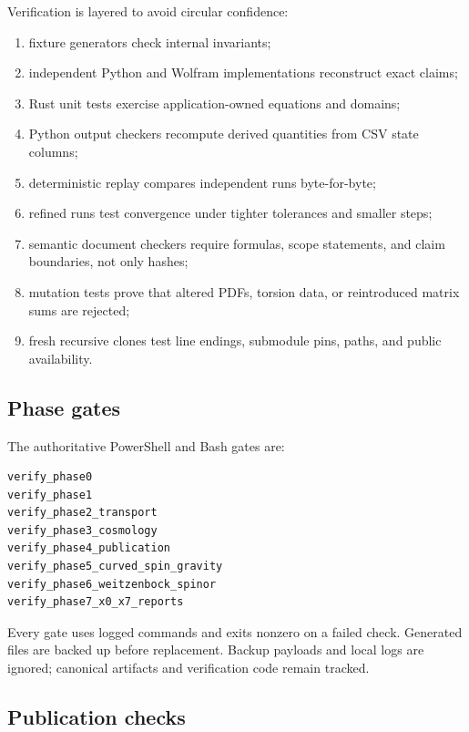 \documentclass[11pt]{article}
\begin{document}
Verification is layered to avoid circular confidence:

\begin{enumerate}
\item fixture generators check internal invariants;
\item independent Python and Wolfram implementations reconstruct exact claims;
\item Rust unit tests exercise application-owned equations and domains;
\item Python output checkers recompute derived quantities from CSV state columns;
\item deterministic replay compares independent runs byte-for-byte;
\item refined runs test convergence under tighter tolerances and smaller steps;
\item semantic document checkers require formulas, scope statements, and claim
boundaries, not only hashes;

\item mutation tests prove that altered PDFs, torsion data, or reintroduced matrix
sums are rejected;

\item fresh recursive clones test line endings, submodule pins, paths, and public
availability.

\end{enumerate}

\subsection{Phase gates}

The authoritative PowerShell and Bash gates are:

\begin{Verbatim}[fontsize=\small]
verify_phase0
verify_phase1
verify_phase2_transport
verify_phase3_cosmology
verify_phase4_publication
verify_phase5_curved_spin_gravity
verify_phase6_weitzenbock_spinor
verify_phase7_x0_x7_reports
\end{Verbatim}

Every gate uses logged commands and exits nonzero on a failed check. Generated files are backed up before replacement. Backup payloads and local logs are ignored; canonical artifacts and verification code remain tracked.

\subsection{Publication checks}
\end{document}
